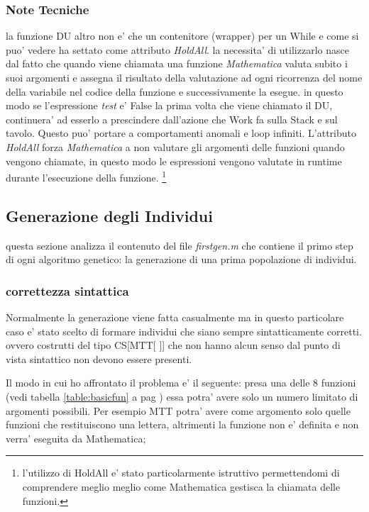 \documentclass[12pt, a4paper]{article}
\begin{document}
\subsubsection{Note Tecniche}
la funzione DU altro non e' che un contenitore (wrapper) per un While e come si puo' vedere ha settato come attributo {\itshape HoldAll}. la necessita' di utilizzarlo nasce dal fatto che quando viene chiamata una funzione {\itshape Mathematica} valuta subito i suoi argomenti e assegna il risultato della valutazione ad ogni ricorrenza del nome della variabile nel codice della funzione e successivamente la esegue. in questo modo se l'espressione {\itshape test} e' False la prima volta che viene chiamato il DU, continuera' ad esserlo a prescindere dall'azione che Work fa sulla Stack e sul tavolo. Questo puo' portare a comportamenti anomali e loop infiniti. L'attributo {\itshape HoldAll} forza {\itshape Mathematica} a non valutare gli argomenti delle funzioni quando vengono chiamate, in questo modo le espressioni vengono valutate in runtime durante l'esecuzione della funzione.
\footnote{l'utilizzo di HoldAll e' stato particolarmente istruttivo permettendomi di comprendere meglio meglio come Mathematica gestisca la chiamata delle funzioni.}


\subsection{Generazione degli Individui}
questa sezione analizza il contenuto del file {\itshape firstgen.m} che contiene
il primo step di ogni algoritmo genetico: la generazione di una prima popolazione di individui.

\subsubsection{correttezza sintattica}
\label{sec:sintax}
Normalmente la generazione viene fatta casualmente ma in questo particolare caso e' stato scelto di formare individui che siano sempre sintatticamente corretti. ovvero costrutti del tipo  CS[MTT[ ]] che non hanno alcun senso dal punto di vista sintattico non devono essere presenti.

Il modo in cui ho affrontato il problema e' il seguente: presa una delle 8 funzioni (vedi tabella \ref{table:basicfun} a pag \pageref{table:basicfun}) essa potra' avere solo un numero limitato di argomenti possibili. Per esempio MTT potra' avere come argomento solo quelle funzioni che restituiscono una lettera, altrimenti la funzione non e' definita e non verra' eseguita da Mathematica;
\end{document}
